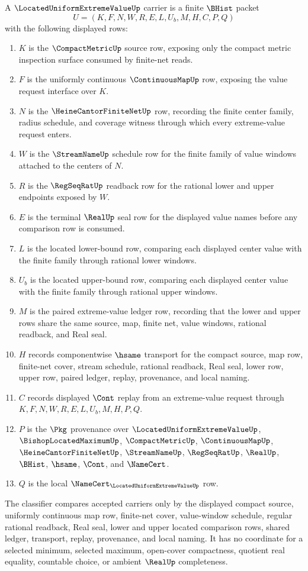 \begin{definition}
\label{def:located-uniform-extreme-value-carrier}
A $\LocatedUniformExtremeValueUp$ carrier is a finite $\BHist$ packet
$$
U=(K,F,N,W,R,E,L,U_b,M,H,C,P,Q)
$$
with the following displayed rows:
\begin{enumerate}
\item $K$ is the $\CompactMetricUp$ source row, exposing only the compact metric inspection surface consumed by finite-net reads.
\item $F$ is the uniformly continuous $\ContinuousMapUp$ row, exposing the value request interface over $K$.
\item $N$ is the $\HeineCantorFiniteNetUp$ row, recording the finite center family, radius schedule, and coverage witness through which every extreme-value request enters.
\item $W$ is the $\StreamNameUp$ schedule row for the finite family of value windows attached to the centers of $N$.
\item $R$ is the $\RegSeqRatUp$ readback row for the rational lower and upper endpoints exposed by $W$.
\item $E$ is the terminal $\RealUp$ seal row for the displayed value names before any comparison row is consumed.
\item $L$ is the located lower-bound row, comparing each displayed center value with the finite family through rational lower windows.
\item $U_b$ is the located upper-bound row, comparing each displayed center value with the finite family through rational upper windows.
\item $M$ is the paired extreme-value ledger row, recording that the lower and upper rows share the same source, map, finite net, value windows, rational readback, and Real seal.
\item $H$ records componentwise $\hsame$ transport for the compact source, map row, finite-net cover, stream schedule, rational readback, Real seal, lower row, upper row, paired ledger, replay, provenance, and local naming.
\item $C$ records displayed $\Cont$ replay from an extreme-value request through $K,F,N,W,R,E,L,U_b,M,H,P,Q$.
\item $P$ is the $\Pkg$ provenance over $\LocatedUniformExtremeValueUp$, $\BishopLocatedMaximumUp$, $\CompactMetricUp$, $\ContinuousMapUp$, $\HeineCantorFiniteNetUp$, $\StreamNameUp$, $\RegSeqRatUp$, $\RealUp$, $\BHist$, $\hsame$, $\Cont$, and $\NameCert$.
\item $Q$ is the local $\NameCert_{\LocatedUniformExtremeValueUp}$ row.
\end{enumerate}
The classifier compares accepted carriers only by the displayed compact source, uniformly continuous map row, finite-net cover, value-window schedule, regular rational readback, Real seal, lower and upper located comparison rows, shared ledger, transport, replay, provenance, and local naming. It has no coordinate for a selected minimum, selected maximum, open-cover compactness, quotient real equality, countable choice, or ambient $\RealUp$ completeness.
\end{definition}

